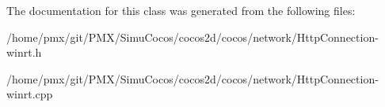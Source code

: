 The documentation for this class was generated from the following files\+:\begin{DoxyCompactItemize}
\item 
/home/pmx/git/\+P\+M\+X/\+Simu\+Cocos/cocos2d/cocos/network/Http\+Connection-\/winrt.\+h\item 
/home/pmx/git/\+P\+M\+X/\+Simu\+Cocos/cocos2d/cocos/network/Http\+Connection-\/winrt.\+cpp\end{DoxyCompactItemize}
